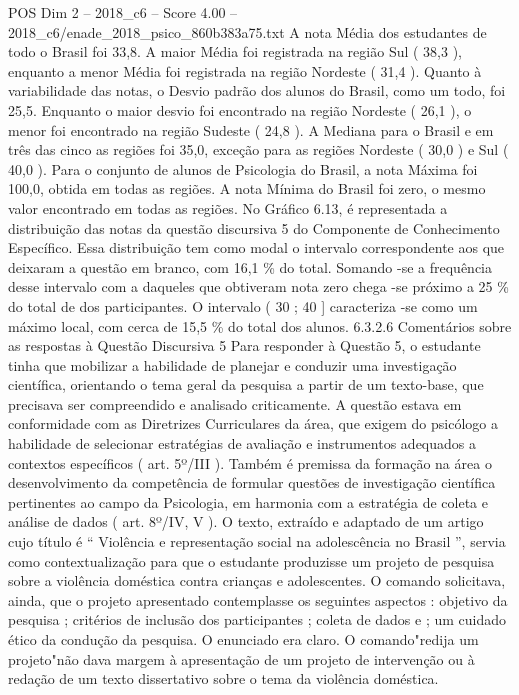 \begin{textsample}{POS Dim 2 – 2018\_c6 – Score 4.00 – 2018\_c6/enade\_2018\_psico\_860b383a75.txt}
A nota Média dos estudantes de todo o Brasil foi 33,8.
A maior Média foi registrada na região Sul ( 38,3 ), enquanto a menor Média foi registrada na região Nordeste ( 31,4 ).
Quanto à variabilidade das notas, o Desvio padrão dos alunos do Brasil, como um todo, foi 25,5.
Enquanto o maior desvio foi encontrado na região Nordeste ( 26,1 ), o menor foi encontrado na região Sudeste ( 24,8 ).
A Mediana para o Brasil e em três das cinco as regiões foi 35,0, exceção para as regiões Nordeste ( 30,0 ) e Sul ( 40,0 ).
Para o conjunto de alunos de Psicologia do Brasil, a nota Máxima foi 100,0, obtida em todas as regiões.
A nota Mínima do Brasil foi zero, o mesmo valor encontrado em todas as regiões.
No Gráfico 6.13, é representada a distribuição das notas da questão discursiva 5 do Componente de Conhecimento Específico.
Essa distribuição tem como modal o intervalo correspondente aos que deixaram a questão em branco, com 16,1 \% do total.
Somando -se a frequência desse intervalo com a daqueles que obtiveram nota zero chega -se próximo a 25 \% do total de dos participantes.
O intervalo ( 30 ; 40 ] caracteriza -se como um máximo local, com cerca de 15,5 \% do total dos alunos. 6.3.2.6 Comentários sobre as respostas à Questão Discursiva 5 Para responder à Questão 5, o estudante tinha que mobilizar a habilidade de planejar e conduzir uma investigação científica, orientando o tema geral da pesquisa a partir de um texto-base, que precisava ser compreendido e analisado criticamente.
A questão estava em conformidade com as Diretrizes Curriculares da área, que exigem do psicólogo a habilidade de selecionar estratégias de avaliação e instrumentos adequados a contextos específicos ( art. 5º/III ).
Também é premissa da formação na área o desenvolvimento da competência de formular questões de investigação científica pertinentes ao campo da Psicologia, em harmonia com a estratégia de coleta e análise de dados ( art. 8º/IV, V ).
O texto, extraído e adaptado de um artigo cujo título é “ Violência e representação social na adolescência no Brasil ”, servia como contextualização para que o estudante produzisse um projeto de pesquisa sobre a violência doméstica contra crianças e adolescentes.
O comando solicitava, ainda, que o projeto apresentado contemplasse os seguintes aspectos : objetivo da pesquisa ; critérios de inclusão dos participantes ; coleta de dados e ; um cuidado ético da condução da pesquisa.
O enunciado era claro.
O comando"redija um projeto"não dava margem à apresentação de um projeto de intervenção ou à redação de um texto dissertativo sobre o tema da violência doméstica.

\end{textsample}
